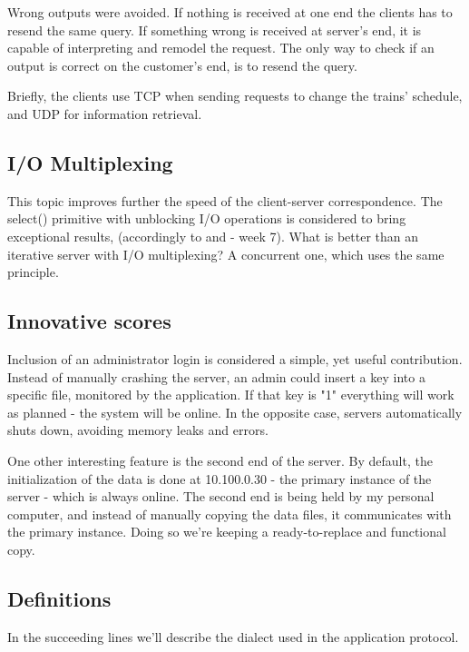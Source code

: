 \documentclass[runningheads]{llncs}
\begin{document}
Wrong outputs were avoided. If nothing is received at one end the clients has to resend the same query. If something wrong is received at server's end, it is capable of interpreting and remodel the request. The only way to check if an output is correct on the customer's end, is to resend the query.

Briefly, the clients use TCP when sending requests to change the trains' schedule, and UDP for information retrieval.

\subsection{I/O Multiplexing}

This topic improves further the speed of the client-server correspondence. The select() primitive with unblocking I/O operations is considered to bring exceptional results, (accordingly to \cite{non-block-select} and \cite{course} - week 7). What is better than an iterative server with I/O multiplexing? A concurrent one, which uses the same principle.

\subsection{Innovative scores}

Inclusion of an administrator login is considered a simple, yet useful contribution. Instead of manually crashing the server, an admin could insert a key into a specific file, monitored by the application. If that key is "1" everything will work as planned - the system will be online. In the opposite case, servers automatically shuts down, avoiding memory leaks and errors.

One other interesting feature is the second end of the server. By default, the initialization of the data is done at 10.100.0.30 - the primary instance of the server - which is always online. The second end is being held by my personal computer, and instead of manually copying the data files, it communicates with the primary instance. Doing so we're keeping a ready-to-replace and functional copy.

\subsection{Definitions}

In the succeeding lines we'll describe the dialect used in the application protocol. 
\end{document}
